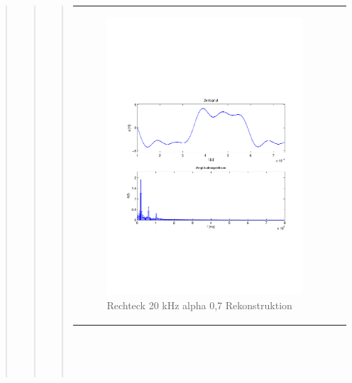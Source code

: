 \begin{quote}
\begin{quote}
\begin{quote}
\begin{center}
\begin{tabular}{ll}
                \begin{minipage}{0.6\textwidth}
                    \begin{figure}[H]
                        \includegraphics[scale=0.55, trim = 16mm 70mm 16mm 85mm, clip]{Bilder/shaperec20_07}
                       \caption{Rechteck 20 kHz alpha 0,7 Rekonstruktion}
		              \label{fig:shaperec20_07}
                    \end{figure}
                \end{minipage}
            
            \end{tabular}
            \end{center}
            \ \\
            \ \\
            \ \\
            

\end{quote}
\end{quote}
\end{quote}
